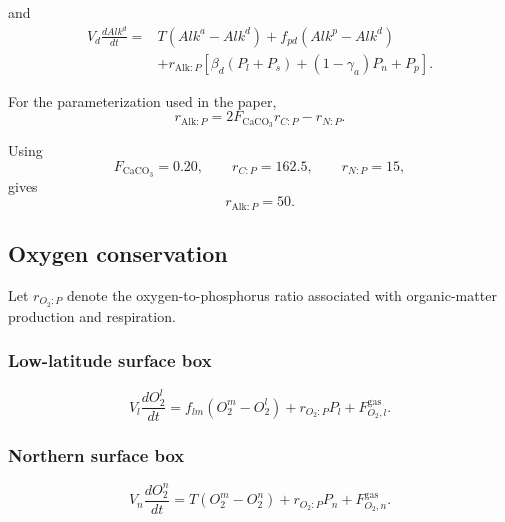 \documentclass[11pt]{article}
\begin{document}
and
\begin{equation}
\begin{split}
V_d\frac{dAlk^d}{dt}
={}&
T
\left(
Alk^a-Alk^d
\right)
+
f_{pd}
\left(
Alk^p-Alk^d
\right)
\\
&+
r_{\mathrm{Alk}:P}
\left[
\beta_d
\left(
P_l+P_s
\right)
+
\left(1-\gamma_a\right)P_n
+
P_p
\right].
\end{split}
\label{eq:seven_alk_d_expanded}
\end{equation}

For the parameterization used in the paper,
\begin{equation}
r_{\mathrm{Alk}:P}
=
2F_{\mathrm{CaCO_3}}r_{C:P}
-
r_{N:P}.
\label{eq:seven_alk_ratio}
\end{equation}

Using
\begin{equation}
F_{\mathrm{CaCO_3}}=0.20,
\qquad
r_{C:P}=162.5,
\qquad
r_{N:P}=15,
\end{equation}
gives
\begin{equation}
r_{\mathrm{Alk}:P}=50.
\label{eq:seven_alk_ratio_value}
\end{equation}

\subsection{Oxygen conservation}

Let \(r_{O_2:P}\) denote the oxygen-to-phosphorus ratio
associated with organic-matter production and respiration.

\subsubsection{Low-latitude surface box}

\begin{equation}
V_l\frac{dO_2^l}{dt}
=
f_{lm}
\left(
O_2^m-O_2^l
\right)
+
r_{O_2:P}P_l
+
F^{\mathrm{gas}}_{O_2,l}.
\label{eq:seven_o2_l}
\end{equation}

\subsubsection{Northern surface box}

\begin{equation}
V_n\frac{dO_2^n}{dt}
=
T
\left(
O_2^m-O_2^n
\right)
+
r_{O_2:P}P_n
+
F^{\mathrm{gas}}_{O_2,n}.
\label{eq:seven_o2_n}
\end{equation}
\end{document}
